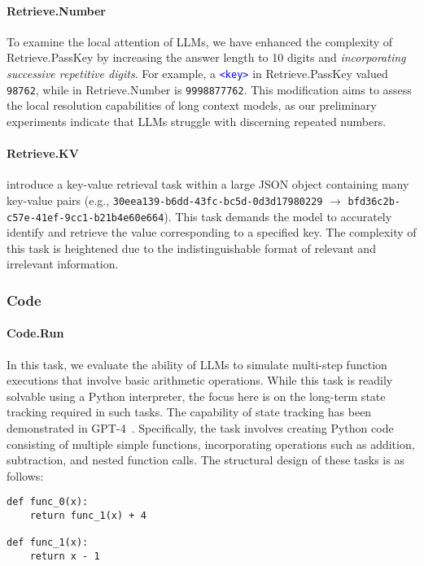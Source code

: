 \paragraph{Retrieve.Number} 

To examine the local attention of LLMs, we have enhanced the complexity of Retrieve.PassKey by increasing the answer length to 10 digits and \textit{incorporating successive repetitive digits}. For example, a \textcolor{blue}{\texttt{<key>}} in Retrieve.PassKey valued \texttt{98762}, while in Retrieve.Number is \texttt{9998877762}. This modification aims to assess the local resolution capabilities of long context models, as our preliminary experiments indicate that LLMs struggle with discerning repeated numbers.

\paragraph{Retrieve.KV} 

\citet{lost-in-the-middle} introduce a key-value retrieval task within a large JSON object containing many key-value pairs (e.g., \texttt{30eea139-b6dd-43fc-bc5d-0d3d17980229} $\rightarrow$ \texttt{bfd36c2b-c57e-41ef-9cc1-b21b4e60e664}). This task demands the model to accurately identify and retrieve the value corresponding to a specified key. The complexity of this task is heightened due to the indistinguishable format of relevant and irrelevant information.

\subsubsection{Code}
\paragraph{Code.Run} 

In this task, we evaluate the ability of LLMs to simulate multi-step function executions that involve basic arithmetic operations. While this task is readily solvable using a Python interpreter, the focus here is on the long-term state tracking required in such tasks. The capability of state tracking has been demonstrated in GPT-4~\citep{bubeck2023sparks}. Specifically, the task involves creating Python code consisting of multiple simple functions, incorporating operations such as addition, subtraction, and nested function calls. The structural design of these tasks is as follows:

\begin{verbatim}
def func_0(x):
    return func_1(x) + 4

def func_1(x):
    return x - 1
\end{verbatim}

